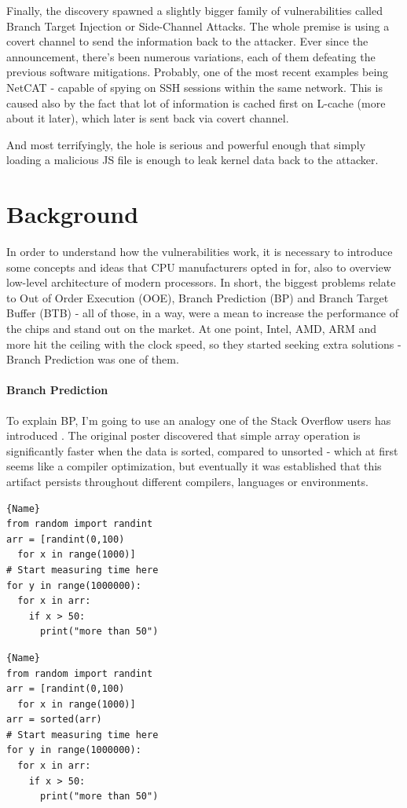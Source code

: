 \documentclass{article}
\begin{document}
Finally, the discovery spawned a slightly bigger family of vulnerabilities called Branch Target Injection or Side-Channel Attacks. The whole premise is using a covert channel to send the information back to the attacker. Ever since the announcement, there's been numerous variations, each of them defeating the previous software mitigations. Probably, one of the most recent examples being NetCAT - capable of spying on SSH sessions within the same network. This is caused also by the fact that lot of information is cached first on L-cache (more about it later), which later is sent back via covert channel. 

And most terrifyingly, the hole is serious and powerful enough that simply loading a malicious JS file is enough to leak kernel data back to the attacker.

\section{Background}

In order to understand how the vulnerabilities work, it is necessary to introduce some concepts and ideas that CPU manufacturers opted in for, also to overview low-level architecture of modern processors. In short, the biggest problems relate to Out of Order Execution (OOE), Branch Prediction (BP) and Branch Target Buffer (BTB) - all of those, in a way, were a mean to increase the performance of the chips and stand out on the market. At one point, Intel, AMD, ARM and more hit the ceiling with the clock speed, so they started seeking extra solutions - Branch Prediction was one of them. 

\paragraph{Branch Prediction}
To explain BP, I'm going to use an analogy one of the Stack Overflow users has introduced \cite{BranchpredictionSO}. The original poster discovered that simple array operation is significantly faster when the data is sorted, compared to unsorted - which at first seems like a compiler optimization, but eventually it was established that this artifact persists throughout different compilers, languages or environments. 

\noindent\begin{minipage}{.45\textwidth}
\begin{lstlisting}[caption=Operation on an unsorted array,frame=tlrb]{Name}
from random import randint
arr = [randint(0,100) 
  for x in range(1000)]
# Start measuring time here
for y in range(1000000):
  for x in arr:
    if x > 50:
      print("more than 50")
\end{lstlisting}
\end{minipage}\hfill
\begin{minipage}{.45\textwidth}
\begin{lstlisting}[caption=Operation on a sorted array,frame=tlrb]{Name}
from random import randint
arr = [randint(0,100) 
  for x in range(1000)]
arr = sorted(arr)
# Start measuring time here
for y in range(1000000):
  for x in arr:
    if x > 50:
      print("more than 50")
\end{lstlisting}
\end{minipage}
\end{document}
